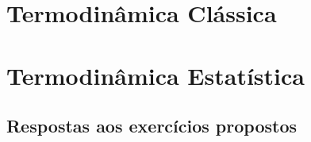 \documentclass[oneside, a4paper, 12pt]{book}
\begin{document}


\newpage
\autotocfalse
\tableofcontents
{}
\autotoctrue

\part{Termodinâmica Clássica}

\part{Termodinâmica Estatística}





\appendix



\chapter*{Respostas aos exercícios propostos}
\printsolutions

\nocite{*}

\end{document}
